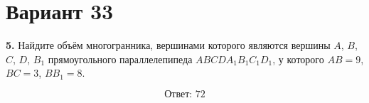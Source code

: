 \documentclass[12pt,a4paper]{article}
\begin{document}
\section*{Вариант 33}

\textbf{5.} Найдите объём многогранника, вершинами которого являются
вершины \(A\), \(B\), \(C\), \(D\), \(B_1\) прямоугольного параллелепипеда
\(ABCDA_1B_1C_1D_1\), у которого
\(AB=9\), \(BC=3\), \(BB_1=8\).

\begin{center}
\end{center}

\[
\boxed{\text{Ответ: }72}
\]
\end{document}
